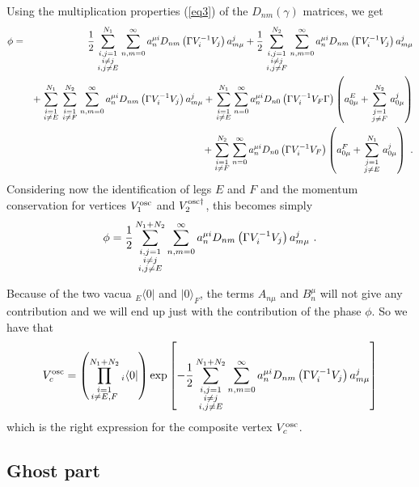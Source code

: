 \documentclass[a4paper,11pt]{article}
\begin{document}
Using the multiplication properties (\ref{eq3}) of the $D_{nm}(\gamma )$ matrices, we get
\begin{eqnarray}
\phi  & = & \frac{1}{2}\sum_{{\scriptstyle i,j=1\atop \scriptstyle i\neq j}\atop \scriptstyle i,j\neq E}^{N_1}\sum_{n,m=0}^\infty a^{\mu i}_nD_{nm}\left( \Gamma V^{-1}_iV_j\right) a^j_{m\mu } +\frac{1}{2}\sum_{{\scriptstyle i,j=1\atop \scriptstyle i\neq j}\atop \scriptstyle i,j\neq F}^{N_2}\sum_{n,m=0}^\infty a^{\mu i}_nD_{nm}\left( \Gamma V^{-1}_iV_j\right) a^j_{m\mu }\nonumber \\
 & & +\sum_{\scriptstyle i=1\atop \scriptstyle i\neq E}^{N_1}\sum_{\scriptstyle i=1\atop \scriptstyle i\neq F}^{N_2}\sum_{n,m=0}^\infty a^{\mu i}_nD_{nm}\left( \Gamma V^{-1}_iV_j\right) a^j_{m\mu } +\sum_{\scriptstyle i=1\atop \scriptstyle i\neq E}^{N_1}\sum_{n=0}^\infty a^{\mu i}_nD_{n0}\left( \Gamma V^{-1}_iV_F\Gamma \right) \left( a^E_{0\mu }+\sum_{\scriptstyle j=1\atop \scriptstyle j\neq F}^{N_2}a^j_{0\mu }\right) \nonumber \\ 
 & & +\sum_{\scriptstyle i=1\atop \scriptstyle i\neq F}^{N_2}\sum_{n=0}^\infty a^{\mu i}_nD_{n0}\left( \Gamma V^{-1}_iV_F\right) \left( a^F_{0\mu }+\sum_{\scriptstyle j=1\atop \scriptstyle j\neq E}^{N_1}a^j_{0\mu }\right) \ .
\end{eqnarray}
Considering now the identification of legs $E$ and $F$ and the momentum conservation for vertices $V^{\rm osc}_1$ and $V^{{\rm osc}\dagger }_2$, this becomes simply
\begin{equation}
\phi =\frac{1}{2}\sum_{{\scriptstyle i,j=1\atop \scriptstyle i\neq j}\atop \scriptstyle i,j\neq E}^{N_1+N_2}\sum_{n,m=0}^\infty a^{\mu i}_nD_{nm}\left( \Gamma V^{-1}_iV_j\right) a^j_{m\mu }\ .
\end{equation}

Because of the two vacua ${ }_E\langle 0|$ and $|0\rangle _F$, the terms $A_{n\mu }$ and $B^\mu _n$ will not give any contribution and we will end up just with the contribution of the phase $\phi $. So we have that
\begin{equation}
V^{\rm osc}_c=\left( \prod_{\scriptstyle i=1\atop \scriptstyle i\neq E,F}^{N_1+N_2}{ }_i\langle 0|\right) \exp \left[ -\frac{1}{2}\sum_{{\scriptstyle i,j=1\atop \scriptstyle i\neq j}\atop \scriptstyle i,j\neq E}^{N_1+N_2}\sum_{n,m=0}^\infty a^{\mu i}_nD_{nm}\left( \Gamma V^{-1}_iV_j\right) a^j_{m\mu }\right] 
\end{equation}
which is the right expression for the composite vertex $V^{\rm osc}_c$.

\subsection{Ghost part}
\end{document}
